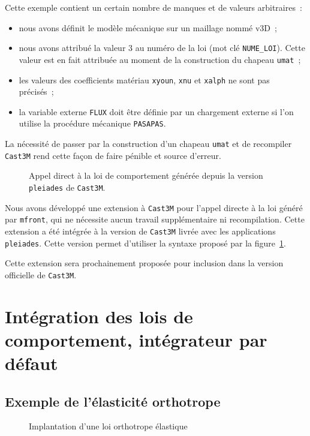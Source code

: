 \documentclass[rectoverso,pleiades,pstricks,leqno,anti]{texmf/note_technique_2010}
\newcommand{\pleiades}{\texttt{pleiades}}
\newcommand{\mfront}{\texttt{mfront}}
\newcommand{\castem}{\texttt{Cast3M}}
\newcommand{\code}[1]{
  \psframebox[linecolor=ceaorange,shadow=true,blur=true]{
    \begin{minipage}[htbp]{1.0\linewidth}
      \ttfamily\scriptsize #1
    \end{minipage}
  }
}
\begin{document}
Cette exemple contient un certain nombre de manques et
de valeurs arbitraires~:
\begin{itemize}
\item nous avons définit le modèle mécanique sur un
  maillage nommé v3D~;
\item nous avons attribué la valeur \(3\) au numéro de
  la loi (mot clé \texttt{NUME\_LOI}). Cette valeur
  est en fait attribuée au moment de la construction
  du chapeau \texttt{umat}~;
\item les valeurs des coefficients matériau \texttt{xyoun},
  \texttt{xnu} et \texttt{xalph} ne sont pas précisés~;
\item la variable externe \texttt{FLUX} doit être définie
  par un chargement externe si l'on utilise la
  procédure mécanique \texttt{PASAPAS}.
\end{itemize}

La nécessité de passer par la construction d'un chapeau
 \texttt{umat} et de recompiler \castem{} rend cette
 façon de faire pénible et source d'erreur.

\begin{figure}[htbp]
  \centering
  \code{{\ttfamily }}  
  \caption{Appel direct à la loi de comportement générée depuis la
    version \pleiades{} de \castem{}.}
  \label{fig:mfrontcastem2}
\end{figure}

Nous avons développé une extension à \castem{} pour
l'appel directe à la loi généré par \mfront{}, qui
ne nécessite aucun travail supplémentaire ni
recompilation. Cette extension a été intégrée à la
version de \castem{} livrée avec les applications
\pleiades{}. Cette version permet d'utiliser
la syntaxe proposé par la
figure~\ref{fig:mfrontcastem2}. 

Cette extension sera prochainement proposée pour inclusion
dans la version officielle de \castem{}.


\clearpage
\newpage
\section{Intégration des lois de comportement, intégrateur par défaut}
\label{sec:defaultparser}

\subsection{Exemple de l'élasticité orthotrope}

\begin{figure}[htbp]
  \centering
  \begin{minipage}[htbp]{0.9\linewidth}
    \shorthandoff{:}
    \code{
      \small
      
    }
    \shorthandon{:}
  \end{minipage}
  \caption{Implantation d'une loi orthotrope élastique}
  \label{fig:OrthoElastique}
\end{figure}
\end{document}
